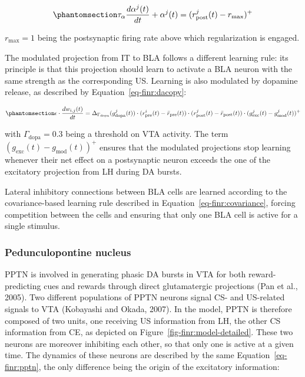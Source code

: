\documentclass[
  11pt,
  a4paper,
]{scrbook}
\begin{document}
\begin{equation}\phantomsection\label{eq-finr:alpha}{
    \tau_\alpha \frac{d\alpha^j(t)}{dt} + \alpha^j(t) = (r^j_{\text{post}}(t) - r_{\text{max}}) ^+
}\end{equation}

\(r_{\text{max}} = 1\) being the postsynaptic firing rate above which
regularization is engaged.

The modulated projection from IT to BLA follows a different learning
rule: its principle is that this projection should learn to activate a
BLA neuron with the same strength as the corresponding US. Learning is
also modulated by dopamine release, as described by
Equation~\ref{eq-finr:dacopy}:

\begin{equation}\phantomsection\label{eq-finr:dacopy}{
    \epsilon \cdot \frac{dw_{i, j}(t)}{dt} =  \Delta_{\Gamma_{\text{dopa}}} (g^j_{\text{dopa}}(t) ) \cdot (r^i_{\text{pre}}(t) - \bar{r}_{\text{pre}}(t) ) \cdot (r^j_{\text{post}}(t) - \bar{r}_{\text{post}}(t)) \cdot (g^j_{\text{exc}}(t) - g^j_{\text{mod}}(t))^+
}\end{equation}

with \(\Gamma_{\text{dopa}}=0.3\) being a threshold on VTA activity. The
term \((g_{\text{exc}}(t) - g_{\text{mod}}(t))^+\) ensures that the
modulated projections stop learning whenever their net effect on a
postsynaptic neuron exceeds the one of the excitatory projection from LH
during DA bursts.

Lateral inhibitory connections between BLA cells are learned according
to the covariance-based learning rule described in
Equation~\ref{eq-finr:covariance}, forcing competition between the cells
and ensuring that only one BLA cell is active for a single stimulus.

\subsubsection*{Pedunculopontine
nucleus}\label{pedunculopontine-nucleus-1}

PPTN is involved in generating phasic DA bursts in VTA for both
reward-predicting cues and rewards through direct glutamatergic
projections (Pan et al., 2005). Two different populations of PPTN
neurons signal CS- and US-related signals to VTA (Kobayashi and Okada,
2007). In the model, PPTN is therefore composed of two units, one
receiving US information from LH, the other CS information from CE, as
depicted on Figure~\ref{fig-finr:model-detailed}. These two neurons are
moreover inhibiting each other, so that only one is active at a given
time. The dynamics of these neurons are described by the same
Equation~\ref{eq-finr:pptn}, the only difference being the origin of the
excitatory information:
\end{document}
